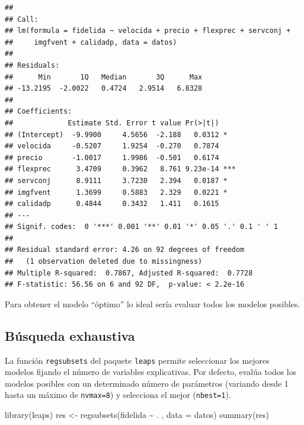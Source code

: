 \documentclass[
]{book}
\newenvironment{Shaded}{\begin{snugshade}}{\end{snugshade}}
\newcommand{\AttributeTok}[1]{\textcolor[rgb]{0.77,0.63,0.00}{#1}}
\newcommand{\FunctionTok}[1]{\textcolor[rgb]{0.00,0.00,0.00}{#1}}
\newcommand{\NormalTok}[1]{#1}
\newcommand{\OtherTok}[1]{\textcolor[rgb]{0.56,0.35,0.01}{#1}}
\newcommand{\SpecialCharTok}[1]{\textcolor[rgb]{0.00,0.00,0.00}{#1}}
\theoremstyle{break}
\begin{document}
\begin{verbatim}
## 
## Call:
## lm(formula = fidelida ~ velocida + precio + flexprec + servconj + 
##     imgfvent + calidadp, data = datos)
## 
## Residuals:
##      Min       1Q   Median       3Q      Max 
## -13.2195  -2.0022   0.4724   2.9514   6.8328 
## 
## Coefficients:
##             Estimate Std. Error t value Pr(>|t|)    
## (Intercept)  -9.9900     4.5656  -2.188   0.0312 *  
## velocida     -0.5207     1.9254  -0.270   0.7874    
## precio       -1.0017     1.9986  -0.501   0.6174    
## flexprec      3.4709     0.3962   8.761 9.23e-14 ***
## servconj      8.9111     3.7230   2.394   0.0187 *  
## imgfvent      1.3699     0.5883   2.329   0.0221 *  
## calidadp      0.4844     0.3432   1.411   0.1615    
## ---
## Signif. codes:  0 '***' 0.001 '**' 0.01 '*' 0.05 '.' 0.1 ' ' 1
## 
## Residual standard error: 4.26 on 92 degrees of freedom
##   (1 observation deleted due to missingness)
## Multiple R-squared:  0.7867, Adjusted R-squared:  0.7728 
## F-statistic: 56.56 on 6 and 92 DF,  p-value: < 2.2e-16
\end{verbatim}

Para obtener el modelo ``óptimo'' lo ideal sería evaluar todos los modelos posibles.

\hypertarget{buxfasqueda-exhaustiva}{%
\subsection{Búsqueda exhaustiva}\label{buxfasqueda-exhaustiva}}

La función \texttt{regsubsets} del paquete \texttt{leaps} permite seleccionar los mejores modelos
fijando el número de variables explicativas.
Por defecto, evalúa todos los modelos posibles con un determinado número de
parámetros (variando desde 1 hasta un máximo de \texttt{nvmax=8})
y selecciona el mejor (\texttt{nbest=1}).

\begin{Shaded}
\begin{Highlighting}[]
\FunctionTok{library}\NormalTok{(leaps)}
\NormalTok{res }\OtherTok{\textless{}{-}} \FunctionTok{regsubsets}\NormalTok{(fidelida }\SpecialCharTok{\textasciitilde{}}\NormalTok{ . , }\AttributeTok{data =}\NormalTok{ datos)}
\FunctionTok{summary}\NormalTok{(res)}
\end{Highlighting}
\end{Shaded}
\end{document}
